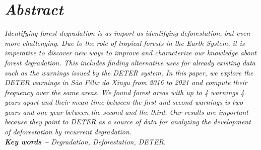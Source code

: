 \section*{\textit {Abstract}} %

\hspace{-1.5mm}\textit{ %
Identifying forest degradation is as import as identifying deforestation, but 
even more challenging.
Due to the role of tropical forests in the Earth System, it is imperative to 
discover new ways to improve and characterize our knowledge about 
forest degradation.
This includes finding alternative uses for already existing data such as the 
warnings issued by the DETER system.
In this paper, we explore the DETER warnings in \textit{São Félix 
do Xingu} from 2016 to 2021 and compute their frequency over the same areas.
We found forest areas with up to 4 warnings 4 years apart and their mean time
between the first and second warnings is two years and one year between the 
second and the third.
Our results are important because they point to DETER as a source of data for 
analyzing the development of deforestation by recurrent degradation.
}
\\

\textit{\textbf{Key words --} %
Degradation, Deforestation, DETER. %
}

